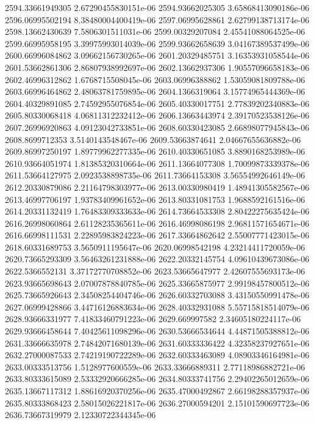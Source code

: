 {2594.33661949305 2.67290455830151e-06
2594.93662025305 3.65868413090186e-06
2596.06995502194 8.38480004400419e-06
2597.06995628861 2.62799138713174e-06
2598.13662430639 7.5806301511031e-06
2599.00329207084 2.45541088064525e-06
2599.66995958195 3.39975993014039e-06
2599.93662658639 3.04167389537499e-06
2600.66996084862 3.09662156730265e-06
2601.20329485751 3.16353931058544e-06
2601.53662861306 2.86807938992697e-06
2602.13662937306 1.90557096658183e-06
2602.46996312862 1.6768715508045e-06
2603.06996388862 1.53059081809788e-06
2603.66996464862 2.48063781759895e-06
2604.1366319064 3.15774965444369e-06
2604.40329891085 2.74592955076854e-06
2605.40330017751 2.77839202340883e-06
2605.80330068418 4.06811312232412e-06
2606.13663443974 2.39170523538126e-06
2607.26996920863 4.09123042733851e-06
2608.60330423085 2.66898077945843e-06
2608.8699712353 3.5140143548467e-06
2609.53663874641 2.04667655636882e-06
2609.86997250197 1.89779962277335e-06
2610.40330651085 3.8890168253989e-06
2610.93664051974 1.81385320310664e-06
2611.13664077308 1.70099873339378e-06
2611.53664127975 2.0923538898735e-06
2611.73664153308 3.56554992646149e-06
2612.20330879086 2.21164798303977e-06
2613.00330980419 1.48941305582567e-06
2613.46997706197 1.93783409961652e-06
2613.80331081753 1.9688592161516e-06
2614.20331132419 1.76483309333633e-06
2614.73664533308 2.80422275635424e-06
2616.26998060864 2.61128235365611e-06
2616.46998086198 2.96811571654671e-06
2616.66998111531 2.22895983824223e-06
2617.33664862642 2.55007771423015e-06
2618.60331689753 3.5650911195647e-06
2620.06998542198 4.23214411720059e-06
2620.73665293309 3.56463261231888e-06
2622.20332145754 4.09610439673086e-06
2622.5366552131 3.37172770708852e-06
2623.53665647977 2.42607555693173e-06
2623.93665698643 2.07007878840785e-06
2625.33665875977 2.99198457800512e-06
2625.73665926643 2.34508254404746e-06
2626.60332703088 3.43150550991478e-06
2627.06999428866 3.44716126883634e-06
2628.40332931088 5.55715818514079e-06
2628.93666331977 7.41833460791223e-06
2629.669997582 2.34605180224117e-06
2629.93666458644 7.40425611098296e-06
2630.53666534644 4.44871505388812e-06
2631.33666635978 2.74842071680139e-06
2631.60333336422 4.32358237927651e-06
2632.27000087533 2.74219190722289e-06
2632.60333463089 4.08903346164981e-06
2633.00333513756 1.5128977600559e-06
2633.33666889311 2.77118986882721e-06
2633.80333615089 2.53332920666285e-06
2634.80333741756 2.29402265012659e-06
2635.13667117312 1.88616920370256e-06
2635.47000492867 2.66198288357937e-06
2635.80333868423 2.58015026221817e-06
2636.27000594201 2.15101590697723e-06
2636.73667319979 2.12330722344345e-06
}
